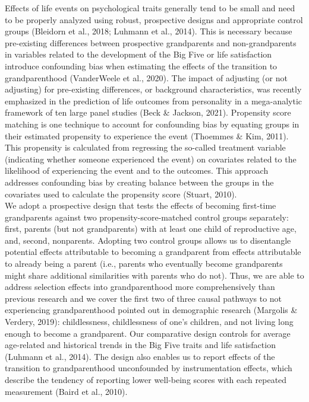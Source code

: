 \documentclass[
  english,
  man, noextraspace,floatsintext]{apa7}
\begin{document}
Effects of life events on psychological traits generally tend to be small and need to be properly analyzed using robust, prospective designs and appropriate control groups (Bleidorn et al., 2018; Luhmann et al., 2014). This is necessary because pre-existing differences between prospective grandparents and non-grandparents in variables related to the development of the Big Five or life satisfaction introduce confounding bias when estimating the effects of the transition to grandparenthood (VanderWeele et al., 2020). The impact of adjusting (or not adjusting) for pre-existing differences, or background characteristics, was recently emphasized in the prediction of life outcomes from personality in a mega-analytic framework of ten large panel studies (Beck \& Jackson, 2021). Propensity score matching is one technique to account for confounding bias by equating groups in their estimated propensity to experience the event (Thoemmes \& Kim, 2011). This propensity is calculated from regressing the so-called treatment variable (indicating whether someone experienced the event) on covariates related to the likelihood of experiencing the event and to the outcomes. This approach addresses confounding bias by creating balance between the groups in the covariates used to calculate the propensity score (Stuart, 2010).\\
We adopt a prospective design that tests the effects of becoming first-time grandparents against two propensity-score-matched control groups separately: first, parents (but not grandparents) with at least one child of reproductive age, and, second, nonparents. Adopting two control groups allows us to disentangle potential effects attributable to becoming a grandparent from effects attributable to already being a parent (i.e., parents who eventually become grandparents might share additional similarities with parents who do not). Thus, we are able to address selection effects into grandparenthood more comprehensively than previous research and we cover the first two of three causal pathways to not experiencing grandparenthood pointed out in demographic research (Margolis \& Verdery, 2019): childlessness, childlessness of one's children, and not living long enough to become a grandparent. Our comparative design controls for average age-related and historical trends in the Big Five traits and life satisfaction (Luhmann et al., 2014). The design also enables us to report effects of the transition to grandparenthood unconfounded by instrumentation effects, which describe the tendency of reporting lower well-being scores with each repeated measurement (Baird et al., 2010).\\
\end{document}
